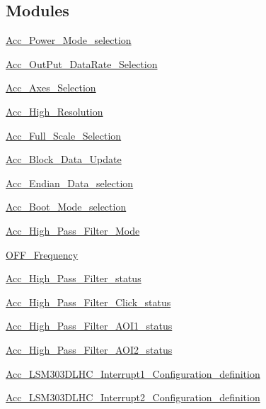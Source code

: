 \subsection*{Modules}
\begin{DoxyCompactItemize}
\item 
\hyperlink{group__Acc__Power__Mode__selection}{Acc\+\_\+\+Power\+\_\+\+Mode\+\_\+selection}
\item 
\hyperlink{group__Acc__OutPut__DataRate__Selection}{Acc\+\_\+\+Out\+Put\+\_\+\+Data\+Rate\+\_\+\+Selection}
\item 
\hyperlink{group__Acc__Axes__Selection}{Acc\+\_\+\+Axes\+\_\+\+Selection}
\item 
\hyperlink{group__Acc__High__Resolution}{Acc\+\_\+\+High\+\_\+\+Resolution}
\item 
\hyperlink{group__Acc__Full__Scale__Selection}{Acc\+\_\+\+Full\+\_\+\+Scale\+\_\+\+Selection}
\item 
\hyperlink{group__Acc__Block__Data__Update}{Acc\+\_\+\+Block\+\_\+\+Data\+\_\+\+Update}
\item 
\hyperlink{group__Acc__Endian__Data__selection}{Acc\+\_\+\+Endian\+\_\+\+Data\+\_\+selection}
\item 
\hyperlink{group__Acc__Boot__Mode__selection}{Acc\+\_\+\+Boot\+\_\+\+Mode\+\_\+selection}
\item 
\hyperlink{group__Acc__High__Pass__Filter__Mode}{Acc\+\_\+\+High\+\_\+\+Pass\+\_\+\+Filter\+\_\+\+Mode}
\item 
\hyperlink{group__Acc__High__Pass__CUT}{O\+F\+F\+\_\+\+Frequency}
\item 
\hyperlink{group__Acc__High__Pass__Filter__status}{Acc\+\_\+\+High\+\_\+\+Pass\+\_\+\+Filter\+\_\+status}
\item 
\hyperlink{group__Acc__High__Pass__Filter__Click__status}{Acc\+\_\+\+High\+\_\+\+Pass\+\_\+\+Filter\+\_\+\+Click\+\_\+status}
\item 
\hyperlink{group__Acc__High__Pass__Filter__AOI1__status}{Acc\+\_\+\+High\+\_\+\+Pass\+\_\+\+Filter\+\_\+\+A\+O\+I1\+\_\+status}
\item 
\hyperlink{group__Acc__High__Pass__Filter__AOI2__status}{Acc\+\_\+\+High\+\_\+\+Pass\+\_\+\+Filter\+\_\+\+A\+O\+I2\+\_\+status}
\item 
\hyperlink{group__Acc__LSM303DLHC__Interrupt1__Configuration__definition}{Acc\+\_\+\+L\+S\+M303\+D\+L\+H\+C\+\_\+\+Interrupt1\+\_\+\+Configuration\+\_\+definition}
\item 
\hyperlink{group__Acc__LSM303DLHC__Interrupt2__Configuration__definition}{Acc\+\_\+\+L\+S\+M303\+D\+L\+H\+C\+\_\+\+Interrupt2\+\_\+\+Configuration\+\_\+definition}

\end{DoxyCompactItemize}
